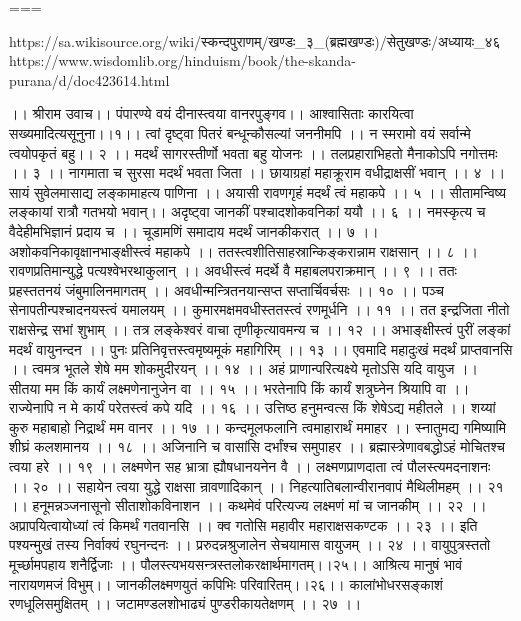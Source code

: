 ===

https://sa.wikisource.org/wiki/स्कन्दपुराणम्/खण्डः_३_(ब्रह्मखण्डः)/सेतुखण्डः/अध्यायः_४६
https://www.wisdomlib.org/hinduism/book/the-skanda-purana/d/doc423614.html

।। श्रीराम उवाच।।
पंपारण्ये वयं दीनास्त्वया वानरपुङ्गव।।
आश्वासिताः कारयित्वा सख्यमादित्यसूनुना।।१।।
त्वां दृष्ट्वा पितरं बन्धून्कौसल्यां जननीमपि ।।
न स्मरामो वयं सर्वान्मे त्वयोपकृतं बहु।। २ ।।
मदर्थं सागरस्तीर्णो भवता बहु योजनः ।।
तलप्रहाराभिहतो मैनाकोऽपि नगोत्तमः ।। ३ ।।
नागमाता च सुरसा मदर्थं भवता जिता ।।
छायाग्रहां महाक्रूराम वधीद्राक्षसीं भवान् ।। ४ ।।
सायं सुवेलमासाद्य लङ्कामाहत्य पाणिना ।।
अयासी रावणगृहं मदर्थं त्वं महाकपे ।। ५ ।।
सीतामन्विष्य लङ्कायां रात्रौ गतभयो भवान्।।
अदृष्ट्वा जानकीं पश्चादशोकवनिकां ययौ ।। ६ ।।
नमस्कृत्य च वैदेहीमभिज्ञानं प्रदाय च ।।
चूडामणिं समादाय मदर्थं जानकीकरात् ।। ७ ।।
अशोकवनिकावृक्षानभाङ्क्षीस्त्वं महाकपे ।।
ततस्त्वशीतिसाहस्रान्किङ्करान्नाम राक्षसान् ।। ८ ।।
रावणप्रतिमान्युद्धे पत्यश्वेभरथाकुलान् ।।
अवधीस्त्वं मदर्थे वै महाबलपराक्रमान् ।। ९ ।।
ततः प्रहस्ततनयं जंबुमालिनमागतम् ।।
अवधीन्मन्त्रितनयान्सप्त सप्तार्चिवर्चसः ।। १० ।।
पञ्च सेनापतीन्पश्चादनयस्त्वं यमालयम् ।।
कुमारमक्षमवधीस्ततस्त्वं रणमूर्धनि ।। ११ ।।
तत इन्द्रजिता नीतो राक्षसेन्द्र सभां शुभाम् ।।
तत्र लङ्केश्वरं वाचा तृणीकृत्यावमन्य च ।। १२ ।।
अभाङ्क्षीस्त्वं पुरीं लङ्कां मदर्थं वायुनन्दन ।।
पुनः प्रतिनिवृत्तस्त्वमृष्यमूकं महागिरिम् ।। १३ ।।
एवमादि महादुःखं मदर्थं प्राप्तवानसि ।।
त्वमत्र भूतले शेषे मम शोकमुदीरयन् ।। १४ ।।
अहं प्राणान्परित्यक्ष्ये मृतोऽसि यदि वायुज ।।
सीतया मम किं कार्यं लक्ष्मणेनानुजेन वा ।। १५ ।।
भरतेनापि किं कार्यं शत्रुघ्नेन श्रियापि वा ।।
राज्येनापि न मे कार्यं परेतस्त्वं कपे यदि ।। १६ ।।
उत्तिष्ठ हनुमन्वत्स किं शेषेऽद्य महीतले ।।
शय्यां कुरु महाबाहो निद्रार्थं मम वानर ।। १७ ।।
कन्दमूलफलानि त्वमाहारार्थं ममाहर ।।
स्नातुमद्य गमिष्यामि शीघ्रं कलशमानय ।। १८ ।।
अजिनानि च वासांसि दर्भांश्च समुपाहर ।।
ब्रह्मास्त्रेणावबद्धोऽहं मोचितश्च त्वया हरे ।। १९ ।।
लक्ष्मणेन सह भ्रात्रा ह्यौषधानयनेन वै ।।
लक्ष्मणप्राणदाता त्वं पौलस्त्यमदनाशनः ।। २० ।।
सहायेन त्वया युद्धे राक्षसा न्रावणादिकान् ।।
निहत्यातिबलान्वीरानवापं मैथिलीमहम् ।। २१ ।।
हनूमन्नञ्जनासूनो सीताशोकविनाशन ।।
कथमेवं परित्यज्य लक्ष्मणं मां च जानकीम् ।। २२ ।।
अप्रापयित्वायोध्यां त्वं किमर्थं गतवानसि ।।
क्व गतोसि महावीर महाराक्षसकण्टक ।। २३ ।।
इति पश्यन्मुखं तस्य निर्वाक्यं रघुनन्दनः ।।
प्ररुदन्नश्रुजालेन सेचयामास वायुजम् ।। २४ ।।
वायुपुत्रस्ततो मूर्च्छामपहाय शनैर्द्विजाः ।।
पौलस्त्यभयसन्त्रस्तलोकरक्षार्थमागतम्।।२५।।
आश्रित्य मानुषं भावं नारायणमजं विभुम्।।
जानकीलक्ष्मणयुतं कपिभिः परिवारितम्।।२६।।
कालांभोधरसङ्काशं रणधूलिसमुक्षितम् ।।
जटामण्डलशोभाढ्यं पुण्डरीकायतेक्षणम् ।। २७ ।।
